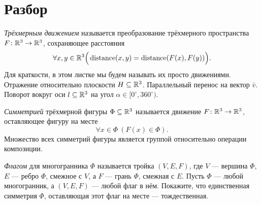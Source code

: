 \documentclass[a4paper,12pt]{article}
\begin{document}
    
    \section{Разбор}
    
     \emph{Трёхмерным движением} называется преобразование трёхмерного пространства $F\colon \mathbb{R}^3 \to \mathbb{R}^3$, сохраняющее расстояния
    \begin{equation*}
        \forall x,y \in \mathbb{R}^3 \Big(\operatorname{distance}(x, y) = \operatorname{distance}(F(x), F(y))\Big).
    \end{equation*}
    Для краткости, в этом листке мы будем называть их просто движениями.
    \example Отражение относительно плоскости $H \subseteq \mathbb{R}^3$.
    \example Параллельный перенос на вектор $\bar{v}$.
    \example Поворот вокруг оси $l \subseteq \mathbb{R}^3$ на угол $\alpha \in [0^\circ,360^\circ)$.
    
     \emph{Симметрией} трёхмерной фигуры $\Phi \subseteq \mathbb{R}^3$ называется движение $F\colon \mathbb{R}^3 \to \mathbb{R}^3$, оставляющее фигуру на месте
    \begin{equation*}
        \forall x \in \Phi \ (F(x) \in \Phi).
    \end{equation*}
    \problem Множество всех симметрий фигуры является группой относительно операции композиции.
    
     \emph{Флагом} для многогранника $\Phi$ называется тройка $(V, E, F)$, где $V$ --- вершина $\Phi$, $E$ --- ребро $\Phi$, смежное с $V$, а $F$ --- грань $\Phi$, смежная с $E$.
    \problem Пусть $\Phi$ --- любой многогранник, а $(V, E, F)$ --- любой флаг в нём. Покажите, что единственная симметрия $\Phi$, оставляющая этот флаг на месте --- тождественная.
    
\end{document}
